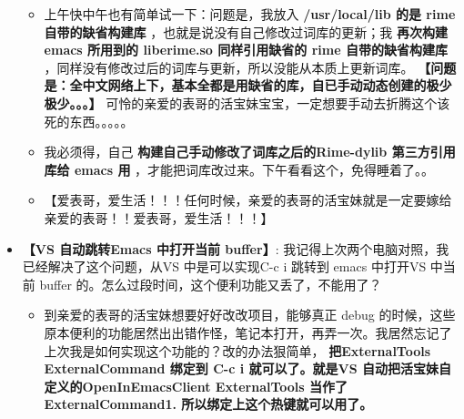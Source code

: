 \documentclass[9pt, b5paper]{article}
\begin{document}
\begin{itemize}
\begin{itemize}
\item 上午快中午也有简单试一下：问题是，我放入 \textbf{/usr/local/lib 的是 rime 自带的缺省构建库} ，也就是说没有自己修改过词库的更新；我 \textbf{再次构建 emacs 所用到的 liberime.so 同样引用缺省的 rime 自带的缺省构建库} ，同样没有修改过后的词库与更新，所以没能从本质上更新词库。 \textbf{【问题是：全中文网络上下，基本全都是用缺省的库，自已手动动态创建的极少极少。。。】} 可怜的亲爱的表哥的活宝妹宝宝，一定想要手动去折腾这个该死的东西。。。。。
\item 我必须得，自己 \textbf{构建自己手动修改了词库之后的Rime-dylib 第三方引用库给 emacs 用} ，才能把词库改过来。下午看看这个，免得睡着了。。
\item 【爱表哥，爱生活！！！任何时候，亲爱的表哥的活宝妹就是一定要嫁给亲爱的表哥！！爱表哥，爱生活！！！】
\end{itemize}
\item \textbf{【VS 自动跳转Emacs 中打开当前 buffer】}: 我记得上次两个电脑对照，我已经解决了这个问题，从VS 中是可以实现C-c i 跳转到 emacs 中打开VS 中当前 buffer 的。怎么过段时间，这个便利功能又丢了，不能用了？
\begin{itemize}
\item 到亲爱的表哥的活宝妹想要好好改改项目，能够真正 debug 的时候，这些原本便利的功能居然出出错作怪，笔记本打开，再弄一次。我居然忘记了上次我是如何实现这个功能的？改的办法狠简单， \textbf{把ExternalTools ExternalCommand 绑定到 C-c i 就可以了。就是VS 自动把活宝妹自定义的OpenInEmacsClient ExternalTools 当作了 ExternalCommand1. 所以绑定上这个热键就可以用了。}
\end{itemize}
\end{itemize}
\end{document}
